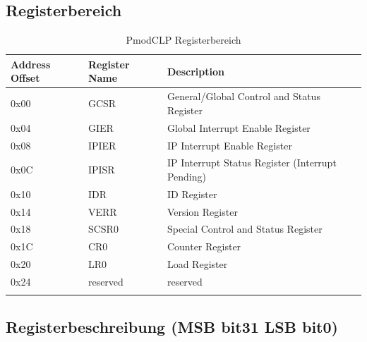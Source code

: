 \subsection{Registerbereich}
\begin{longtable}{|p{3cm}|p{4cm}|p{7cm}|}
\hline
\textbf{Address Offset} & \textbf{Register Name} & \textbf{Description} \\
\hline
0x00 & GCSR & General/Global Control and Status Register \\
\hline
0x04 & GIER & Global Interrupt Enable Register \\
\hline
0x08 & IPIER & IP Interrupt Enable Register \\
\hline
0x0C & IPISR & IP Interrupt Status Register (Interrupt Pending) \\
\hline
0x10 & IDR & ID Register \\
\hline
0x14 & VERR & Version Register \\
\hline
0x18 & SCSR0 & Special Control and Status Register \\
\hline
0x1C & CR0 & Counter Register \\
\hline
0x20 & LR0 & Load Register \\
\hline
0x24 & reserved & reserved \\
\hline
\caption{PmodCLP Registerbereich}
\end{longtable}

\subsection{Registerbeschreibung (MSB bit31 LSB bit0)}

